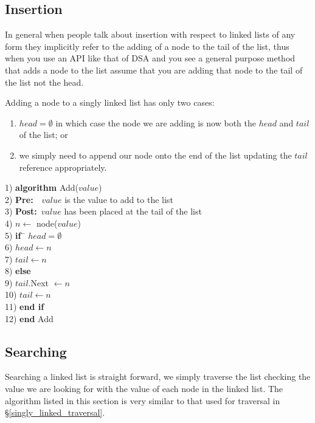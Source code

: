 \subsection{Insertion} \label{single_insertion}
In general when people talk about insertion with respect to linked lists of any form they implicitly refer to the adding of a node to the tail of the list, thus when you use an API like that of DSA and you see a general purpose method that adds a node to the list assume that you are adding that node to the tail of the list not the head.

Adding a node to a singly linked list has only two cases: 
\begin{enumerate}
\item $head = \emptyset$ in which case the node we are adding is now both the $head$ and $tail$ of the list; or
\item we simply need to append our node onto the end of the list updating the $tail$ reference appropriately.
\end{enumerate}

\begin{tabbing}
1)  \textbf{alg}\= \textbf{orithm} Add($value$) \\
2)  \> \textbf{Pre:}~~$value$ is the value to add to the list \\
3)  \> \textbf{Post:}~$value$ has been placed at the tail of the list \\
4)  \> $n \leftarrow$ node($value$) \\
5)  \> \textbf{if}~\= $head = \emptyset$ \\
6)  \> \> $head \leftarrow n$ \\
7)  \> \> $tail \leftarrow n$ \\
8)  \> \textbf{else} \\
9)  \> \> $tail$.Next $\leftarrow n$ \\
10) \> \> $tail \leftarrow n$ \\
11) \> \textbf{end if} \\
12) \textbf{end} Add \\
\end{tabbing}

\subsection{Searching} \label{single_search}
Searching a linked list is straight forward, we simply traverse the list checking the value we are looking for with the value of each node in the linked list. The algorithm listed in this section is very similar to that used for traversal in \S\ref{singly_linked_traversal}.

